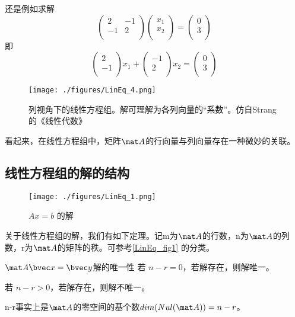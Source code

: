 \begin{example}{}
还是例如求解
$$
\begin{pmatrix}
2&-1\\
-1&2\\
\end{pmatrix}
\begin{pmatrix}
x_1\\
x_2\\
\end{pmatrix}
=
\begin{pmatrix}
0\\
3\\
\end{pmatrix}
$$
即
$$
\begin{pmatrix}
2\\
-1\\
\end{pmatrix}
x_1
+
\begin{pmatrix}
-1\\
2\\
\end{pmatrix}
x_2
=
\begin{pmatrix}
0\\
3\\
\end{pmatrix}
$$
\begin{figure}[ht]
\centering
\texttt{[image: ./figures/LinEq\_4.png]}
\caption{列视角下的线性方程组。解可理解为各列向量的“系数”。仿自Strang的《线性代数》} \label{LinEq_fig4}
\end{figure}
\end{example}
看起来，在线性方程组中，矩阵$\mat A$的行向量与列向量存在一种微妙的关联。

\subsection{线性方程组的解的结构}
\begin{figure}[ht]
\centering
\texttt{[image: ./figures/LinEq\_1.png]}
\caption{$Ax=b$ 的解} \label{LinEq_fig1}
\end{figure}


关于线性方程组的解，我们有如下定理。记m为$\mat A$的行数，n为$\mat A$的列数，r为$\mat A$的矩阵的秩。可参考\autoref{LinEq_fig1} 的分类。

\begin{theorem}{$\mat A \bvec x=\bvec y$解的唯一性}
若 $n-r=0$，若解存在，则解唯一。

若 $n-r>0$，若解存在，则解不唯一。
\end{theorem}
n-r事实上是$\mat A$的零空间的基个数$dim(Nul(\mat A))=n-r$。

